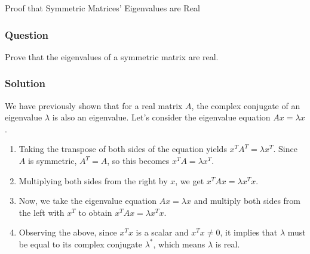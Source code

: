 \begin{examplebox}{Proof that Symmetric Matrices' Eigenvalues are Real}
\subsubsection*{Question}
Prove that the eigenvalues of a symmetric matrix are real.

\subsubsection*{Solution}

We have previously shown that for a real matrix \( A \), the complex conjugate of an eigenvalue \( \lambda \) is also an eigenvalue. Let's consider the eigenvalue equation \( Ax = \lambda x \).

\begin{enumerate}
    \item Taking the transpose of both sides of the equation yields \( x^T A^T = \lambda x^T \). Since \( A \) is symmetric, \( A^T = A \), so this becomes \( x^T A = \lambda x^T \).
    \item Multiplying both sides from the right by \( x \), we get \( x^T Ax = \lambda x^T x \).
    \item Now, we take the eigenvalue equation \( Ax = \lambda x \) and multiply both sides from the left with \( x^T \) to obtain \( x^T Ax = \lambda x^T x \).
    \item Observing the above, since \( x^T x \) is a scalar and \( x^T x \neq 0 \), it implies that \( \lambda \) must be equal to its complex conjugate \( \lambda^* \), which means \( \lambda \) is real.
\end{enumerate}
  
\end{examplebox}
